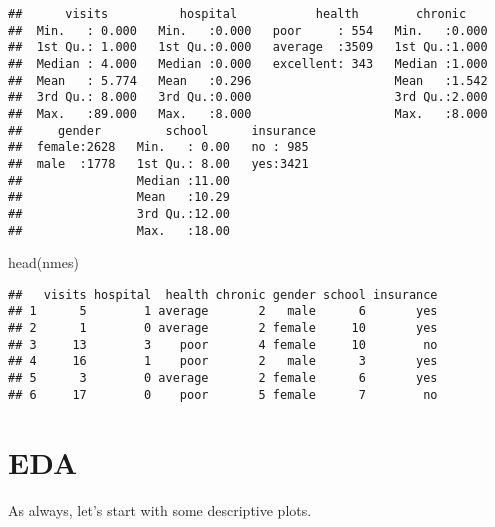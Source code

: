 \documentclass[
  oneside]{book}
\newenvironment{Shaded}{\begin{snugshade}}{\end{snugshade}}
\newcommand{\FunctionTok}[1]{\textcolor[rgb]{0.00,0.00,0.00}{#1}}
\newcommand{\NormalTok}[1]{#1}
\begin{document}
\begin{verbatim}
##      visits          hospital           health        chronic     
##  Min.   : 0.000   Min.   :0.000   poor     : 554   Min.   :0.000  
##  1st Qu.: 1.000   1st Qu.:0.000   average  :3509   1st Qu.:1.000  
##  Median : 4.000   Median :0.000   excellent: 343   Median :1.000  
##  Mean   : 5.774   Mean   :0.296                    Mean   :1.542  
##  3rd Qu.: 8.000   3rd Qu.:0.000                    3rd Qu.:2.000  
##  Max.   :89.000   Max.   :8.000                    Max.   :8.000  
##     gender         school      insurance 
##  female:2628   Min.   : 0.00   no : 985  
##  male  :1778   1st Qu.: 8.00   yes:3421  
##                Median :11.00             
##                Mean   :10.29             
##                3rd Qu.:12.00             
##                Max.   :18.00
\end{verbatim}

\begin{Shaded}
\begin{Highlighting}[]
\FunctionTok{head}\NormalTok{(nmes)}
\end{Highlighting}
\end{Shaded}

\begin{verbatim}
##   visits hospital  health chronic gender school insurance
## 1      5        1 average       2   male      6       yes
## 2      1        0 average       2 female     10       yes
## 3     13        3    poor       4 female     10        no
## 4     16        1    poor       2   male      3       yes
## 5      3        0 average       2 female      6       yes
## 6     17        0    poor       5 female      7        no
\end{verbatim}

\hypertarget{eda-2}{%
\section{EDA}\label{eda-2}}

As always, let's start with some descriptive plots.
\end{document}
